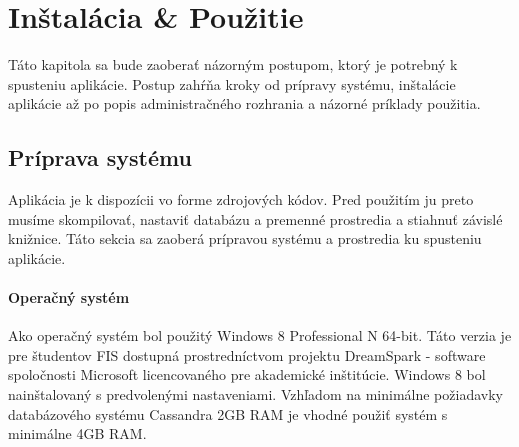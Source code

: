 \chapter{Inštalácia \& Použitie}
\label{chap:instalacia}
	Táto kapitola sa bude zaoberať názorným postupom, ktorý je potrebný k spusteniu aplikácie. Postup zahŕňa kroky od prípravy systému, inštalácie aplikácie až po popis administračného rozhrania a názorné príklady použitia.
	
		
\section{Príprava systému}
	Aplikácia je k dispozícii vo forme zdrojových kódov. Pred použitím ju preto musíme skompilovať, nastaviť databázu a premenné prostredia a stiahnuť závislé knižnice. Táto sekcia sa zaoberá prípravou systému a prostredia ku spusteniu aplikácie.

\subsubsection{Operačný systém}
	Ako operačný systém bol použitý Windows 8 Professional N 64-bit. Táto verzia je pre študentov FIS dostupná prostredníctvom projektu DreamSpark - software spoločnosti Microsoft licencovaného pre akademické inštitúcie. Windows 8 bol nainštalovaný s predvolenými nastaveniami. Vzhľadom na minimálne požiadavky databázového systému Cassandra 2GB RAM je vhodné použiť systém s minimálne 4GB RAM.

